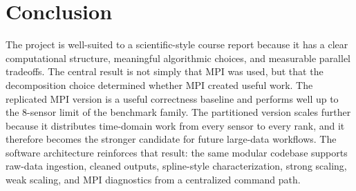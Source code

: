 \documentclass[11pt]{article}
\begin{document}
\section{Conclusion}
The project is well-suited to a scientific-style course report because it has a clear computational structure, meaningful algorithmic choices, and measurable parallel tradeoffs. The central result is not simply that MPI was used, but that the decomposition choice determined whether MPI created useful work. The replicated MPI version is a useful correctness baseline and performs well up to the 8-sensor limit of the benchmark family. The partitioned version scales further because it distributes time-domain work from every sensor to every rank, and it therefore becomes the stronger candidate for future large-data workflows. The software architecture reinforces that result: the same modular codebase supports raw-data ingestion, cleaned outputs, spline-style characterization, strong scaling, weak scaling, and MPI diagnostics from a centralized command path.



\end{document}
